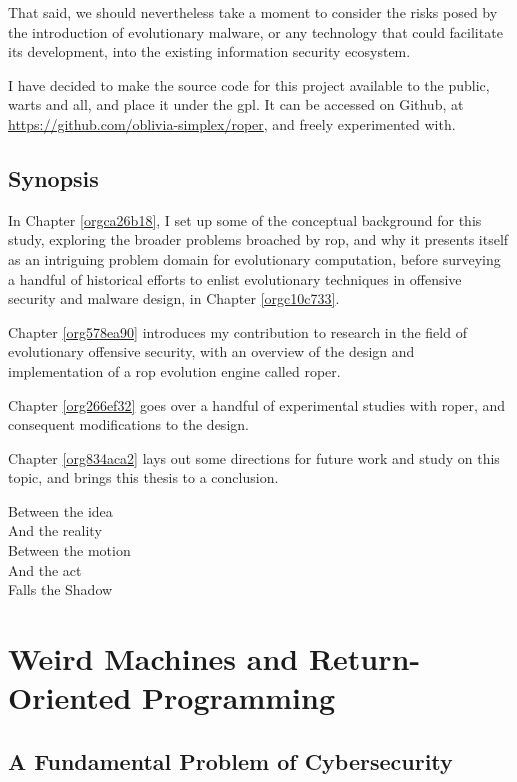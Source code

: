 \documentclass[12pt,glossary]{dalthesis}
\begin{document}
That said, we should nevertheless take a moment to consider the risks posed
by the introduction of evolutionary malware, or any technology that could facilitate
its development, into the existing information security ecosystem.


I have decided to make the source code for this project available to the public,
warts and all, and place it under the \gls{gpl}. It can be accessed on Github,
at \url{https://github.com/oblivia-simplex/roper}, and freely experimented with. 


\section{Synopsis}
\label{sec:orgf399e1b}
\label{orgc303e4c}

In Chapter \ref{orgca26b18}, I set up some of the conceptual
background for this study, exploring the broader problems broached by \gls{rop}, 
and why it presents itself as an intriguing problem domain for evolutionary
computation, before surveying a handful of historical efforts to
enlist evolutionary techniques in offensive security and malware
design, in Chapter \ref{orgc10c733}.

Chapter \ref{org578ea90} introduces my contribution to research in the field of
evolutionary offensive security, with an overview of the design and implementation of
a \gls{rop} evolution engine called \gls{roper}.

Chapter \ref{org266ef32} goes over a handful of experimental studies with
\gls{roper}, and consequent modifications to the design. 

Chapter \ref{org834aca2} lays out some directions for future work and study on this
topic, and brings this thesis to a conclusion.



\begin{savequote}
Between the idea\\  
And the reality\\  
Between the motion\\ 
And the act\\
Falls the Shadow
\end{savequote}
\chapter{Weird Machines and Return-Oriented Programming}
\label{sec:orgfe0005c}
\label{orgca26b18}
\label{org4e3ba2c}
\section{A Fundamental Problem of Cybersecurity}
\label{sec:org5b61a7c}
\label{org3de27f4}
\end{document}
